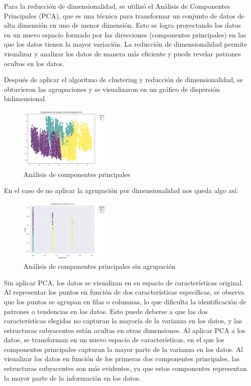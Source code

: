 \documentclass{wsdcr}
\begin{document}
Para la reducción de dimensionalidad, se utilizó el Análisis de Componentes Principales (PCA), que es una técnica para transformar un conjunto de datos de alta dimensión en uno de menor dimensión. Esto se logra proyectando los datos en un nuevo espacio formado por las direcciones (componentes principales) en las que los datos tienen la mayor variación. La reducción de dimensionalidad permite visualizar y analizar los datos de manera más eficiente y puede revelar patrones ocultos en los datos.

Después de aplicar el algoritmo de clustering y reducción de dimensionalidad, se obtuvieron las agrupaciones y se visualizaron en un gráfico de dispersión bidimensional.

\begin{figure}[h]
    \centering
    \includegraphics[width=0.4\textwidth]{charts/normalized/kmn_pca.png}
    \caption{Análisis de componentes principales}
    \label{fig:principalcomponentanalysis}
\end{figure}

En el caso de no aplicar la agrupación por dimensionalidad nos queda algo así:

\begin{figure}[h]
    \centering
    \includegraphics[width=0.4\textwidth]{charts/normalized/kmn_without_pca.png}
    \caption{Análisis de componentes principales sin agrupación}
    \label{fig:principalcomponentanalysiswithoutpca}
\end{figure}

Sin aplicar PCA, los datos se visualizan en su espacio de características original. Al representar los puntos en función de dos características específicas, se observa que los puntos se agrupan en filas o columnas, lo que dificulta la identificación de patrones o tendencias en los datos. Esto puede deberse a que las dos características elegidas no capturan la mayoría de la varianza en los datos, y las estructuras subyacentes están ocultas en otras dimensiones.
Al aplicar PCA a los datos, se transforman en un nuevo espacio de características, en el que los componentes principales capturan la mayor parte de la varianza en los datos. Al visualizar los datos en función de los primeras dos componentes principales, las estructuras subyacentes son más evidentes, ya que estos componentes representan la mayor parte de la información en los datos.
\end{document}
